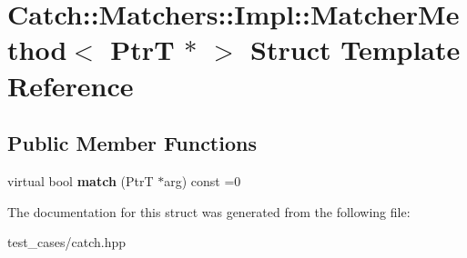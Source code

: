 \hypertarget{structCatch_1_1Matchers_1_1Impl_1_1MatcherMethod_3_01PtrT_01_5_01_4}{}\section{Catch\+:\+:Matchers\+:\+:Impl\+:\+:Matcher\+Method$<$ PtrT $\ast$ $>$ Struct Template Reference}
\label{structCatch_1_1Matchers_1_1Impl_1_1MatcherMethod_3_01PtrT_01_5_01_4}
\subsection*{Public Member Functions}
\begin{DoxyCompactItemize}
\item 
\mbox{\label{structCatch_1_1Matchers_1_1Impl_1_1MatcherMethod_3_01PtrT_01_5_01_4_a5fdd64f9509724f32ffc73cb320181d1}} 
virtual bool {\bfseries match} (PtrT $\ast$arg) const =0
\end{DoxyCompactItemize}


The documentation for this struct was generated from the following file\+:\begin{DoxyCompactItemize}
\item 
test\+\_\+cases/catch.\+hpp\end{DoxyCompactItemize}
